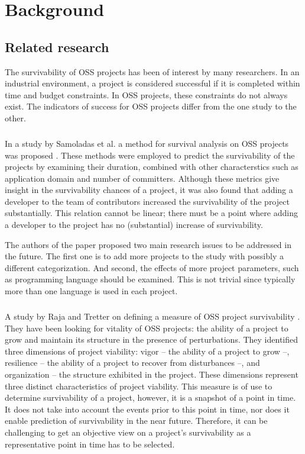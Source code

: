 \chapter{Background}
\label{background}

\section{Related research}
The survivability of OSS projects has been of interest by many researchers. In
an industrial environment, a project is considered successful if it is completed
within time and budget constraints. In OSS projects, these constraints do not
always exist. The indicators of success for OSS projects differ from the one
study to the other.

\paragraph{}
In a study by Samoladas et al. a method for survival analysis on OSS projects
was proposed \cite{samoladas2010}. These methods were employed to predict the
survivability of the projects by examining their duration, combined with other
characterstics such as application domain and number of committers.
Although these metrics give insight in the survivability chances of a project,
it was also found that adding a developer to the team of contributors increased
the survivability of the project substantially. This relation cannot be linear;
there must be a point where adding a developer to the project has no
(substantial) increase of survivability.

The authors of the paper proposed two main research issues to be addressed in
the future. The first one is to add more projects to the study with possibly a
different categorization.
And second, the effects of more project parameters, such as programming
language should be examined. This is not trivial since typically more than one
language is used in each project.

\paragraph{}
A study by Raja and Tretter on defining a measure of OSS project survivability
\cite{raja2012}.
They have been looking for vitality of OSS projects: the ability of a project
to grow and maintain its structure in the presence of perturbations. They
identified three dimensions of project viability: vigor -- the ability of a
project to grow --, resilience -- the ability of a project to recover from
disturbances --, and organization -- the structure exhibited in the project.
These dimensions represent three distinct characteristics of project viability.
This measure is of use to determine survivability of a project, however, it is
a snapshot of a point in time. It does not take into account the events prior
to this point in time, nor does it enable prediction of survivability in the
near future. Therefore, it can be challenging to get an objective view on a
project's survivability as a representative point in time has to be selected.

